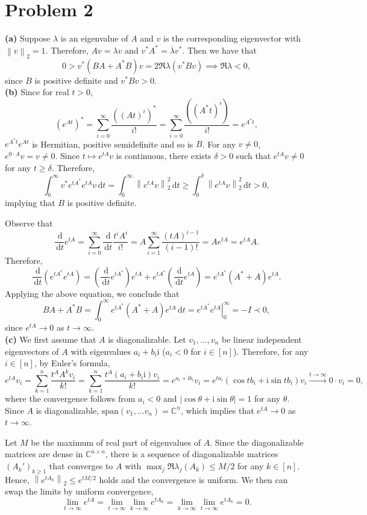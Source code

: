 \documentclass[11pt]{article}
\theoremstyle{plain}
\theoremstyle{definition}
\theoremstyle{remark}
\newcommand{\dif}{\,\mathrm{d}}
\newcommand{\norm}[1]{\left\lVert #1 \right\rVert}
\newcommand{\C}{\mathbb{C}}
\newcommand{\tuple}[1]{\left(#1\right)}
\newcommand{\tp}{\tuple}
\newcommand{\Span}{\-{span}}
\def\-#1{\mathrm{#1}} %
\begin{document}
\section*{Problem 2}
\textbf{(a)}
Suppose $\lambda$ is an eigenvalue of $A$ and $v$ is the corresponding eigenvector with $\norm{v}_2 = 1$.
Therefore, $Av = \lambda v$ and $v^*A^* = \overline{\lambda}v^*$.
Then we have that
$$
    0 > v^*(BA+A^*B)v = 2\Re\lambda (v^*Bv) \implies \Re\lambda < 0,
$$
since $B$ is positive definite and $v^*Bv > 0$.
\\\textbf{(b)} 
Since for real $t > 0$,
$$
    \tp{e^{At}}^* = \sum_{i=0}^\infty \frac{((At)^i)^*}{i!} = \sum_{i=0}^\infty \frac{((A^*t)^i)}{i!} = e^{A^* t}, 
$$
$e^{A^*t}e^{At}$ is Hermitian, positive semidefinite and so is $B$.
For any $v\neq 0$, $e^{0\cdot A}v = v \neq 0$.
Since $t\mapsto e^{tA} v$ is continuous, there exists $\delta > 0$ such that $e^{tA}v \neq 0$ for any $t\geq \delta$.
Therefore,
$$
    \int_0^\infty v^*e^{tA^*}e^{tA}v \dif t = 
    \int_0^\infty \norm{e^{tA}v}_2^2 \dif t
    \geq \int_0^\delta \norm{e^{tA}v}_2^2 \dif t > 0,
$$
implying that $B$ is positive definite.

Observe that
$$
    \frac{\dif}{\dif t}e^{tA} = \sum_{i=0}^\infty\frac{\dif}{\dif t}\frac{t^iA^i}{i!}
    = A \sum_{i=1}^\infty \frac{(tA)^{i-1}}{(i-1)!} = A e^{tA} = e^{tA}A.
$$
Therefore,
$$
    \frac{\dif}{\dif t}\tp{e^{tA^*}e^{tA}} =  \tp{\frac{\dif}{\dif t}e^{tA^*}}e^{tA} + e^{tA^*}\tp{\frac{\dif}{\dif t} e^{tA}} = e^{tA^*}(A^*+A)e^{tA}.
$$
Applying the above equation, we conclude that
$$
    BA+A^*B = \int_0^\infty e^{tA^*} (A^*+A) e^{tA}\dif t = \left. e^{tA^*}e^{tA} \right|_{0}^{\infty} = -I \prec 0,
$$
since $e^{tA}\to 0$ as $t\to \infty$.
\\\textbf{(c)} 
We first assume that $A$ is diagonalizable.
Let $v_1,\ldots,v_n$ be linear independent eigenvectors of $A$ with eigenvalues $a_i + b_i\-i$ ($a_i < 0$ for $i\in[n]$).
Therefore, for any $i\in[n]$, by Euler's formula,
$$
    e^{tA}v_i = \sum_{k=1}^n \frac{t^AA^kv_i}{k!} = \sum_{k=1}^n \frac{t^A(a_i+b_i\-i)v_i}{k!} = e^{a_i+\-i b_i}v_i = e^{ta_i}(\cos tb_i + \-i\sin tb_i)v_i
    \xrightarrow{t\to \infty} 0\cdot v_i = 0,
$$
where the convergence follows from $a_i < 0$ and $|\cos \theta + \-i\sin\theta| = 1$ for any $\theta$.
Since $A$ is diagonalizable, $\Span(v_1,\ldots v_n) = \C^n$, which implies that $e^{tA} \to 0$ as $t\to \infty$.

Let $M$ be the maximum of real part of eigenvalues of $A$.
Since the diagonalizable matrices are dense in $\C^{n\times n}$, there is a sequence of diagonalizable matrices $(A_k')_{k\geq 1}$ that converges to $A$ with $\max_j\Re\lambda_j(A_k)\le M/2$ for any $k\in[n]$.
Hence, $\norm{e^{tA_k}}_2 \leq e^{tM/2}$ holds and the convergence is uniform.
We then can swap the limits by uniform convergence,
$$
    \lim_{t\to \infty} e^{tA} = \lim_{t\to \infty} \lim_{k\to \infty}e^{tA_k}
    = \lim_{k\to \infty}\lim_{t\to \infty} e^{tA_k} = 0 .
$$
\end{document}
